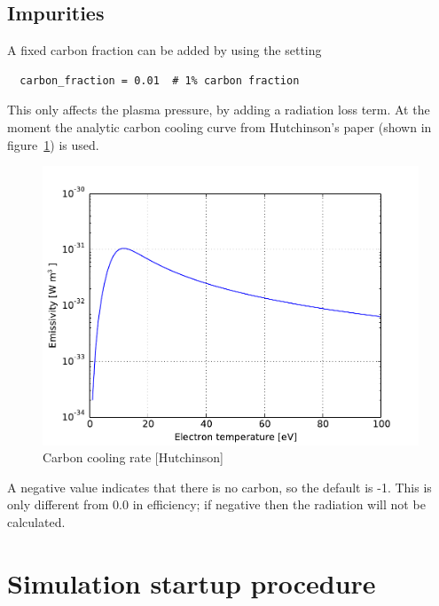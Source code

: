 \documentclass[12pt,a4paper]{article}
\begin{document}
\subsection{Impurities}

A fixed carbon fraction can be added by using the setting
\begin{verbatim}
  carbon_fraction = 0.01  # 1% carbon fraction
\end{verbatim}
This only affects the plasma pressure, by adding a radiation loss term. At the moment
the analytic carbon cooling curve from Hutchinson's paper (shown in figure~\ref{fig:carbon}) is used.
\begin{figure}[h]
\centering
\includegraphics[width=0.7\columnwidth]{figs/carbon_rad.pdf}
\caption{Carbon cooling rate [Hutchinson]}
\label{fig:carbon}
\end{figure}
A negative value indicates that there is no carbon, so the default is -1. 
This is only different from 0.0 in efficiency; if negative then the radiation will not be calculated.

\section{Simulation startup procedure}
\end{document}
